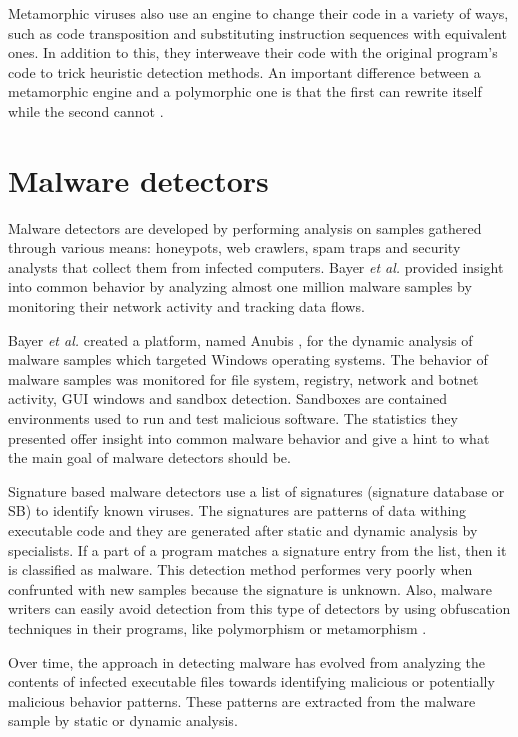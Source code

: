 Metamorphic viruses also use an engine to change their code in a variety of ways, such as code transposition and substituting instruction sequences with equivalent ones. In addition to this, they interweave their code with the original program's code to trick heuristic detection methods. An important difference between a metamorphic engine and a polymorphic one is that the first can rewrite itself while the second cannot \cite{testing-mal-det}.

\section{Malware detectors}
\label{sec:mal-detectors}

Malware detectors are developed by performing analysis on samples gathered through various means: honeypots, web crawlers, spam traps and security analysts that collect them from infected computers. Bayer \textit{et al.} \cite{current-mal-behavior} provided insight into common behavior by analyzing almost one million malware samples by monitoring their network activity and tracking data flows.

Bayer \textit{et al.} created a platform, named Anubis \cite{anubis-platform}, for the dynamic analysis of malware samples which targeted Windows operating systems. The behavior of malware samples was monitored for file system, registry, network and botnet activity, GUI windows and sandbox detection. Sandboxes are contained environments used to run and test malicious software. The statistics they presented offer insight into common malware behavior and give a hint to what the main goal of malware detectors should be.

Signature based malware detectors use a list of signatures (signature database or SB) to identify known viruses. The signatures are patterns of data withing executable code and they are generated after static and dynamic analysis by specialists. If a part of a program matches a signature entry from the list, then it is classified as malware. This detection method performes very poorly when confrunted with new samples because the signature is unknown. Also, malware writers can easily avoid detection from this type of detectors by using obfuscation techniques in their programs, like polymorphism or metamorphism \cite{mining-specifications}. 

Over time, the approach in detecting malware has evolved from analyzing the contents of infected executable files towards identifying malicious or potentially malicious behavior patterns. These patterns are extracted from the malware sample by static or dynamic analysis.

